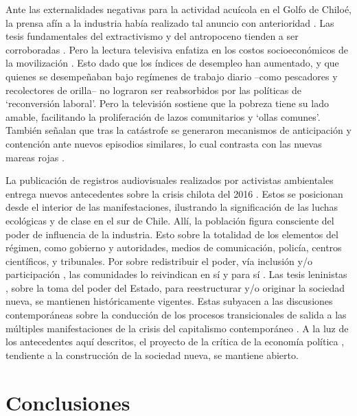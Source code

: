 \documentclass{textolivre}
\begin{document}
Ante las externalidades negativas para la actividad acuícola en el Golfo de Chiloé,
la prensa afín a la industria había realizado tal anuncio con anterioridad \cite{gonzalez2016,infante2016,salmonexpert}.
Las tesis fundamentales del
extractivismo y del antropoceno tienden a ser corroboradas \cite{Foster2016,Gunderson2019}.
Pero la lectura televisiva enfatiza en los
costos socioeconómicos de la movilización \cite{24horasc}. Esto dado que los índices
de desempleo han aumentado, y que quienes se desempeñaban bajo regímenes de
trabajo diario --como pescadores y recolectores de orilla-- no lograron ser reabsorbidos
por las políticas de ‘reconversión laboral’. Pero la televisión sostiene que la pobreza tiene
su lado amable, facilitando la proliferación de lazos comunitarios y ‘ollas comunes’.
También señalan que tras la catástrofe se generaron mecanismos de anticipación y
contención ante nuevos episodios similares, lo cual contrasta con las nuevas mareas rojas
\cite{galaz2016,Kamjunke2017}.

La publicación de registros audiovisuales realizados por activistas ambientales
entrega nuevos antecedentes sobre la crisis chilota del 2016 \cite{quense}. Estos se
posicionan desde el interior de las manifestaciones, ilustrando la significación de las
luchas ecológicas y de clase en el sur de Chile. Allí, la población figura consciente del
poder de influencia de la industria. Esto sobre la totalidad de los elementos del régimen,
como gobierno y autoridades, medios de comunicación, policía, centros científicos, y
tribunales. Por sobre redistribuir el poder, vía inclusión y/o participación \cite{Folke2016,Mascareo2018b}, 
las comunidades lo reivindican en sí y para sí \cite{marx2003}. Las tesis leninistas \cite{lenin1997}, sobre la toma del poder del Estado, para
reestructurar y/o originar la sociedad nueva, se mantienen históricamente vigentes. Estas
subyacen a las discusiones contemporáneas sobre la conducción de los procesos
transicionales de salida a las múltiples manifestaciones de la crisis del capitalismo
contemporáneo \cite{arboleda}. A la luz de los antecedentes aquí descritos, el
proyecto de la crítica de la economía política \cite{marx2010}, tendiente a la construcción
de la sociedad nueva, se mantiene abierto.



\section{Conclusiones}\label{sec-conclusiones}
\end{document}
